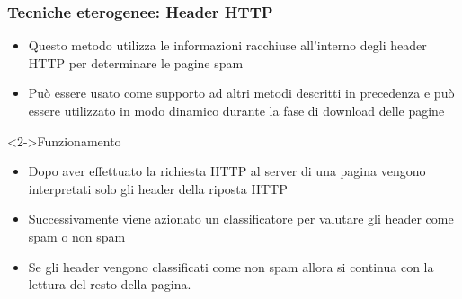 \documentclass{beamer}
\begin{document}
%    
\begin{frame}
  \frametitle{Tecniche eterogenee: Header HTTP}
\begin{itemize}
 \item Questo metodo utilizza le informazioni racchiuse all’interno degli header HTTP per determinare le pagine spam
 \item Può essere usato come supporto ad altri metodi descritti in precedenza e può essere utilizzato in modo dinamico durante la fase di download delle pagine
\end{itemize}
\begin{block}<2->{Funzionamento}
 \begin{itemize}
  \item Dopo aver effettuato la richiesta HTTP al server di una pagina vengono interpretati solo gli header della riposta HTTP
  \item Successivamente viene azionato un classificatore per valutare gli header come spam o non spam
  \item Se gli header vengono classificati come non spam allora si continua con la lettura del resto della pagina.
 \end{itemize}
\end{block}
\end{frame}
\end{document}
